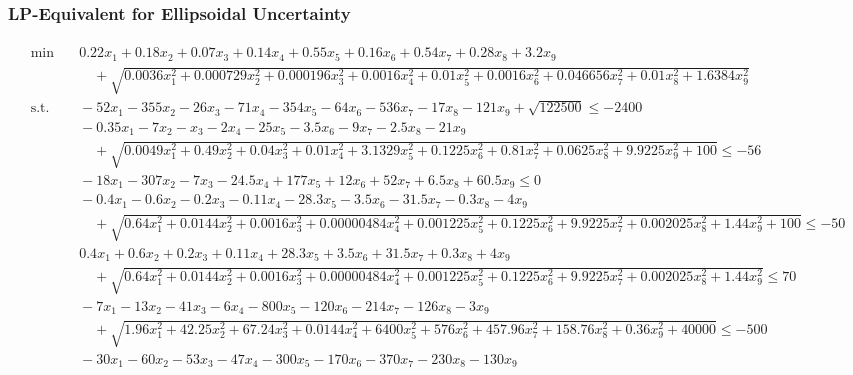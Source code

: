 \documentclass[a4paper,12pt]{article}
\begin{document}
\newpage

\subsubsection*{LP-Equivalent for Ellipsoidal Uncertainty}
\label{sec:lp-equivalent-ellips}
\begin{adjustwidth}{-1.5cm}{}
\begin{tiny}
\setlength{\jot}{0pt}
\[
\begin{aligned}
   \begin{aligned}
    \min & \quad  0.22x_1 + 0.18x_2 + 0.07x_3 + 0.14x_4 + 0.55x_5 + 0.16x_6 + 0.54x_7 + 0.28x_8 + 3.2x_9 \\
    & \qquad+ \sqrt{0.0036x_1^2+0.000729x_2^2+0.000196x_3^2+0.0016x_4^2+0.01x_5^2+0.0016x_6^2+0.046656x_7^2+0.01x_8^2+1.6384x_9^2} \\
    \text{s.t.}
    & \quad -52x_1-355x_2-26x_3-71x_4-354x_5-64x_6-536x_7-17x_8-121x_9+\sqrt{122500} \leq -2400 \\
    & \quad -0.35x_1 - 7x_2 - x_3 - 2x_4 - 25x_5 - 3.5x_6 - 9x_7 - 2.5x_8 - 21x_9 \\
    & \qquad + \sqrt{0.0049x_1^2 + 0.49x_2^2 + 0.04x_3^2 + 0.01x_4^2 + 3.1329x_5^2 + 0.1225x_6^2 + 0.81x_7^2 + 0.0625x_8^2 + 9.9225x_9^2 + 100} \leq -56 \\
    & \quad -18x_1 - 307x_2 - 7x_3 - 24.5x_4 + 177x_5 + 12x_6 + 52x_7 + 6.5x_8 + 60.5x_9 \leq 0 \\
    & \quad -0.4x_1 - 0.6x_2 - 0.2x_3 - 0.11x_4 - 28.3x_5 - 3.5x_6 - 31.5x_7 - 0.3x_8 - 4x_9 \\
    & \qquad + \sqrt{0.64x_1^2+ 0.0144x_2^2 + 0.0016x_3^2 + 0.00000484x_4^2 + 0.001225x_5^2 + 0.1225x_6^2 + 9.9225x_7^2 + 0.002025x_8^2 + 1.44x_9^2 + 100} \leq -50 \\
    & \quad 0.4x_1 + 0.6x_2 + 0.2x_3 + 0.11x_4 + 28.3x_5 + 3.5x_6 + 31.5x_7 + 0.3x_8 + 4x_9 \\
    & \qquad + \sqrt{0.64x_1^2+ 0.0144x_2^2 + 0.0016x_3^2 + 0.00000484x_4^2 + 0.001225x_5^2 + 0.1225x_6^2 + 9.9225x_7^2 + 0.002025x_8^2 + 1.44x_9^2} \leq 70 \\
    & \quad -7x_1 - 13x_2 - 41x_3 - 6x_4 - 800x_5 - 120x_6 - 214x_7 - 126x_8 - 3x_9 \\
    & \qquad + \sqrt{1.96x_1^2 + 42.25x_2^2 + 67.24x_3^2 + 0.0144x_4^2 + 6400x_5^2 + 576x_6^2 + 457.96x_7^2 + 158.76x_8^2 + 0.36x_9^2 + 40000} \leq -500 \\
    & \quad -30x_1 - 60x_2 - 53x_3 - 47x_4 - 300x_5 -170x_6 - 370x_7 -230x_8 - 130x_9 \\

\end{aligned}
\end{aligned}\]
\end{tiny}
\end{adjustwidth}
\end{document}
